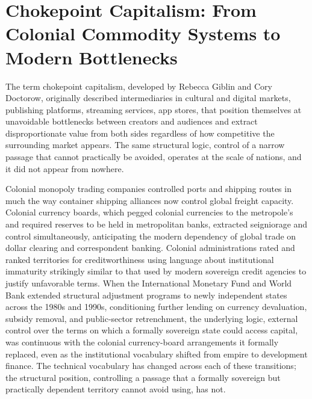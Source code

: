 \documentclass[11pt]{article}
\begin{document}
\section{Chokepoint Capitalism: From Colonial Commodity Systems to Modern Bottlenecks}

The term chokepoint capitalism, developed by Rebecca Giblin and Cory Doctorow, originally described intermediaries in cultural and digital markets, publishing platforms, streaming services, app stores, that position themselves at unavoidable bottlenecks between creators and audiences and extract disproportionate value from both sides regardless of how competitive the surrounding market appears. The same structural logic, control of a narrow passage that cannot practically be avoided, operates at the scale of nations, and it did not appear from nowhere.

Colonial monopoly trading companies controlled ports and shipping routes in much the way container shipping alliances now control global freight capacity. Colonial currency boards, which pegged colonial currencies to the metropole's and required reserves to be held in metropolitan banks, extracted seigniorage and control simultaneously, anticipating the modern dependency of global trade on dollar clearing and correspondent banking. Colonial administrations rated and ranked territories for creditworthiness using language about institutional immaturity strikingly similar to that used by modern sovereign credit agencies to justify unfavorable terms. When the International Monetary Fund and World Bank extended structural adjustment programs to newly independent states across the 1980s and 1990s, conditioning further lending on currency devaluation, subsidy removal, and public-sector retrenchment, the underlying logic, external control over the terms on which a formally sovereign state could access capital, was continuous with the colonial currency-board arrangements it formally replaced, even as the institutional vocabulary shifted from empire to development finance. The technical vocabulary has changed across each of these transitions; the structural position, controlling a passage that a formally sovereign but practically dependent territory cannot avoid using, has not.
\end{document}
